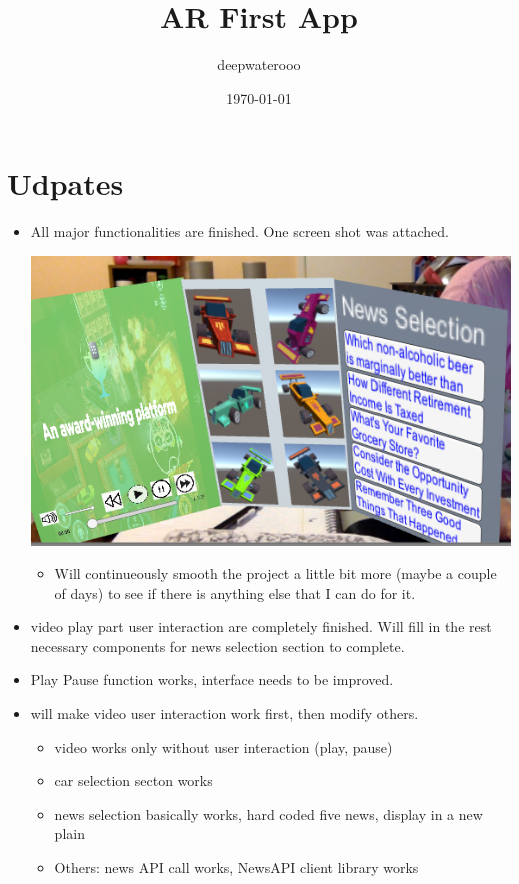 \documentclass[9pt, b5paper]{article}
\author{deepwaterooo}
\date{\today}
\title{AR First App}
\begin{document}
\maketitle
\tableofcontents


\section{Udpates}
\label{sec-1}
\begin{itemize}
\item All major functionalities are finished. One screen shot was attached. 

\includegraphics[width=.9\linewidth]{./pic/one.png}
\begin{itemize}
\item Will continueously smooth the project a little bit more (maybe a couple of days) to see if there is anything else that I can do for it.
\end{itemize}
\item video play part user interaction are completely finished. Will fill in the rest necessary components for news selection section to complete.
\item Play Pause function works, interface needs to be improved.
\item will make video user interaction work first, then modify others. 
\begin{itemize}
\item video works only without user interaction (play, pause)
\item car selection secton works
\item news selection basically works, hard coded five news, display in a new plain
\item Others: news API call works, NewsAPI client library works
\end{itemize}
\end{itemize}
\end{document}
